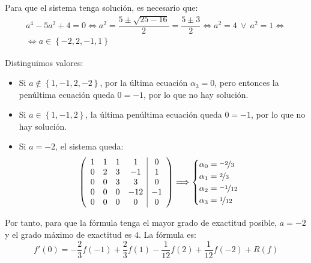 \begin{ejercicio}
\begin{enumerate}
        Para que el sistema tenga solución, es necesario que:
        \begin{multline*}
            a^4-5a^2+4 = 0 \iff a^2=\dfrac{5\pm\sqrt{25-16}}{2} = \dfrac{5\pm 3}{2} \iff a^2 = 4 \ \vee\  a^2 = 1 \iff\\ \iff a\in \left\{-2,2,-1,1\right\}
        \end{multline*}

        Distinguimos valores:
        \begin{itemize}
            \item Si $a\notin \left\{1,-1,2, -2\right\}$, por la última ecuación $\alpha_3=0$, pero entonces la penúltima ecuación queda $0=-1$, por lo que no hay solución.
            \item Si $a\in \left\{1,-1,2\right\}$, la última penúltima ecuación queda $0=-1$, por lo que no hay solución.
            \item Si $a=-2$, el sistema queda:
            \begin{align*}
                \left(\begin{array}{cccc|c}
                    1 & 1 & 1 & 1 & 0 \\
                    0 & 2 & 3 & -1 & 1 \\
                    0 & 0 & 3 & 3 & 0 \\
                    0 & 0 & 0 & -12 & -1 \\
                    0 & 0 & 0 & 0 & 0
                \end{array}\right)\Longrightarrow
                \begin{cases}
                    \alpha_0 = \nicefrac{-2}{3} \\
                    \alpha_1 = \nicefrac{2}{3} \\
                    \alpha_2 = \nicefrac{-1}{12} \\
                    \alpha_3 = \nicefrac{1}{12}
                \end{cases}
            \end{align*}
        \end{itemize}

        Por tanto, para que la fórmula tenga el mayor grado de exactitud posible, $a=-2$ y el grado máximo de exactitud es $4$. La fórmula es:
        \begin{equation*}
            f'(0) = -\dfrac{2}{3}f(-1) + \dfrac{2}{3}f(1) - \dfrac{1}{12}f(2) + \dfrac{1}{12}f(-2) + R(f)
        \end{equation*}
        

\end{enumerate}
\end{ejercicio}
